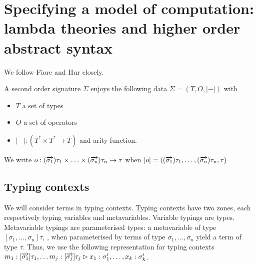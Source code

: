 \section{Specifying a model of computation: lambda theories and higher order abstract syntax}

We follow Fiore and Hur \cite{DBLP:conf/csl/FioreH10} closely.

\begin{definition}
  A second order signature $\Sigma$ enjoys the following data $\Sigma = (T,O,|-|)$ with
  \begin{itemize}
    \item $T$ a set of types
    \item $O$ a set of operators
      \item $|-| : (T^{*} \times T^{*} \to T)$ and arity function.
  \end{itemize}  
\end{definition}

We write $o : (\overrightarrow{\sigma_{1}})\tau_{1} \times \ldots \times (\overrightarrow{\sigma_{n}})\tau_{n} \to \tau$ when $|o| = ((\overrightarrow{\sigma_{1}})\tau_{1}, \ldots, (\overrightarrow{\sigma_{n}})\tau_{n}, \tau)$

\subsection{Typing contexts}
 We will consider terms in typing contexts. Typing contexts have two
 zones, each respectively typing variables and metavariables. Variable
 typings are types. Metavariable typings are parameterised types: a
 metavariable of type $[\sigma_{1},\ldots,\sigma_{n}]\tau$, , when
 parameterised by terms of type $\sigma_{1},\ldots,\sigma_{n}$ yield a
 term of type $\tau$. Thus, we use the following representation for
 typing contexts $m_{1} : [\overrightarrow{\sigma_{1}}]\tau_{1}, \ldots m_{j}: [\overrightarrow{\sigma_{j}}]\tau_{j} \rhd x_{1} : \sigma'_{1}, \ldots, x_{k} : \sigma'_{k}$.
